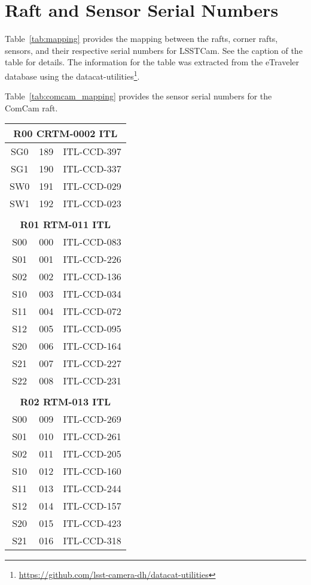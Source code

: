 \appendix
\section{Raft and Sensor Serial Numbers}
Table~\ref{tab:mapping} provides the mapping between the rafts, corner rafts, sensors, and their respective serial numbers for LSSTCam.
See the caption of the table for details.
The information for the table was extracted from the eTraveler database using the datacat-utilities\footnote{\url{https://github.com/lsst-camera-dh/datacat-utilities}}.

Table~\ref{tab:comcam_mapping} provides the sensor serial numbers for the ComCam raft.

\begin{longtable}{ccc}

\multicolumn{3}{c}{\bf R00  CRTM-0002  ITL} \\
\hline
  SG0 & 189 & ITL-CCD-397 \\
  SG1 & 190 & ITL-CCD-337 \\
  SW0 & 191 & ITL-CCD-029 \\
  SW1 & 192 & ITL-CCD-023 \\
 & & \\
\multicolumn{3}{c}{\bf R01  RTM-011  ITL} \\
\hline
  S00 & 000 & ITL-CCD-083 \\
  S01 & 001 & ITL-CCD-226 \\
  S02 & 002 & ITL-CCD-136 \\
  S10 & 003 & ITL-CCD-034 \\
  S11 & 004 & ITL-CCD-072 \\
  S12 & 005 & ITL-CCD-095 \\
  S20 & 006 & ITL-CCD-164 \\
  S21 & 007 & ITL-CCD-227 \\
  S22 & 008 & ITL-CCD-231 \\
 & & \\
\multicolumn{3}{c}{\bf R02  RTM-013  ITL} \\
\hline
  S00 & 009 & ITL-CCD-269 \\
  S01 & 010 & ITL-CCD-261 \\
  S02 & 011 & ITL-CCD-205 \\
  S10 & 012 & ITL-CCD-160 \\
  S11 & 013 & ITL-CCD-244 \\
  S12 & 014 & ITL-CCD-157 \\
  S20 & 015 & ITL-CCD-423 \\
  S21 & 016 & ITL-CCD-318 \\

\end{longtable}
